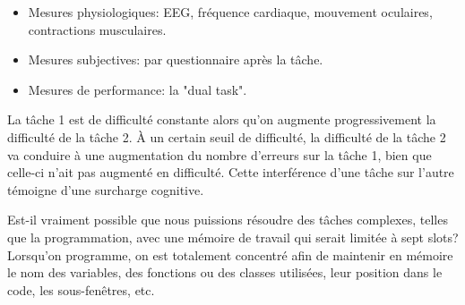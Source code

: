 \begin{itemize}
\item Mesures physiologiques: EEG, fr\'equence cardiaque, mouvement oculaires, contractions musculaires.
\item Mesures subjectives: par questionnaire apr\`es la t\^ache.
\item Mesures de performance: la "dual task".
\end{itemize}

La t\^ache 1 est de difficult\'e constante alors qu'on augmente progressivement la difficult\'e de la t\^ache 2. \`A un certain seuil de difficult\'e, la difficult\'e de la t\^ache 2 va conduire \`a une augmentation du nombre d'erreurs sur la t\^ache 1, bien que celle-ci n'ait pas augment\'e en difficult\'e. Cette interf\'erence d'une t\^ache sur l'autre t\'emoigne d'une surcharge cognitive.

\begin{figure}[H]
\centering
{}
\end{figure}

Est-il vraiment possible que nous puissions r\'esoudre des t\^aches complexes, telles que la programmation, avec une m\'emoire de travail qui serait limit\'ee \`a sept slots? Lorsqu'on programme, on est totalement concentr\'e afin de maintenir en m\'emoire le nom des variables, des fonctions ou des classes utilis\'ees, leur position dans le code, les sous-fen\^etres, etc. 

